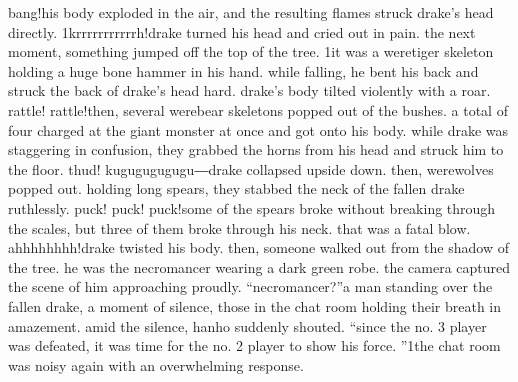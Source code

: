 bang!his body exploded in the air, and the resulting flames struck drake’s head directly.
1krrrrrrrrrrrh!drake turned his head and cried out in pain.
 the next moment, something jumped off the top of the tree.
1it was a weretiger skeleton holding a huge bone hammer in his hand.
 while falling, he bent his back and struck the back of drake’s head hard.
drake’s body tilted violently with a roar.
rattle! rattle!then, several werebear skeletons popped out of the bushes.
 a total of four charged at the giant monster at once and got onto his body.
 while drake was staggering in confusion, they grabbed the horns from his head and struck him to the floor.
thud! kugugugugugu―drake collapsed upside down.
 then, werewolves popped out.
 holding long spears, they stabbed the neck of the fallen drake ruthlessly.
puck! puck! puck!some of the spears broke without breaking through the scales, but three of them broke through his neck.
 that was a fatal blow.
ahhhhhhhh!drake twisted his body.
 then, someone walked out from the shadow of the tree.
he was the necromancer wearing a dark green robe.
the camera captured the scene of him approaching proudly.
“necromancer?”a man standing over the fallen drake, a moment of silence, those in the chat room holding their breath in amazement.
 amid the silence, hanho suddenly shouted.
“since the no.
 3 player was defeated, it was time for the no.
 2 player to show his force.
”1the chat room was noisy again with an overwhelming response.


 